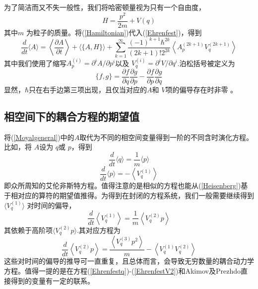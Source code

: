 为了简洁而又不失一般性，我们将哈密顿量视为只有一个自由度，
\begin{equation}
	H=\frac{p^{2}}{2 m}+V(q)
	\label{Hamiltonian}
\end{equation}
其中$m$ 为粒子的质量。将(\ref{Hamiltonian})代入(\ref{Ehrenfest})，得到
\begin{equation}
	\frac{d}{d t}\langle A\rangle=\left\langle\frac{\partial A}{\partial t}\right\rangle+\langle\{A, H\}\rangle+\sum_{k=1}^{\infty} \frac{(-1)^{k+1} \hbar^{2 k}}{(2 k+1) ! 2^{2 k}}\left\langle A_{p}^{(2 k+1)} V_{q}^{(2 k+1)}\right\rangle
	\label{Moyalgeneral}
\end{equation}
其中我们使用了缩写$A_{p}^{(i)}=\partial^{i} A / \partial p^{i}$以及 $V_{q}^{(i)}=\partial^{i} V / \partial q^{i}$.泊松括号被定义为
\begin{equation}
	\{f, g\}=\frac{\partial f}{\partial q} \frac{\partial g}{\partial p}-\frac{\partial f}{\partial p} \frac{\partial g}{\partial q}
\end{equation}
显然，$\hbar$只在右手边第三项出现，且仅当对应的$A$和 $V$项的偏导存在时非零 。

\subsection{相空间下的耦合方程的期望值}
将(\ref{Moyalgeneral})中的$A$取代为不同的相空间变量得到一阶的不同含时演化方程。比如，将 $A$设为 $q$或 $p$，得到
\begin{equation}
\frac{d}{d t}\langle q\rangle=\frac{1}{m}\langle p\rangle
\label{Ehrenfestq}
\end{equation}
\begin{equation}
\frac{d}{d t}\langle p\rangle=-\left\langle V_{q}^{(1)}\right\rangle	
\end{equation}
即众所周知的艾伦非斯特方程。值得注意的是相似的方程也能从(\ref{Heisenberg})基于相对应的算符的期望值推得。为得到在封闭的方程系统，我们一般需要继续得到$\langle V_q^{(1)} \rangle $ 对时间的偏导，
\begin{equation}
	\frac{d}{d t}\left\langle V_{q}^{(1)}\right\rangle=\frac{1}{m}\left\langle V_{q}^{(2)} p\right\rangle
\end{equation}
其依赖于高阶项$\langle V_q^{(2)} p \rangle $.其对应方程为
\begin{equation}
	\frac{d}{d t}\left\langle V_{q}^{(2)} p\right\rangle=\frac{\left\langle V_{q}^{(3)} p^{2}\right\rangle}{m}-\left\langle V_{q}^{(1)} V_{q}^{(2)}\right\rangle
\label{EhrenfestV2}
\end{equation}
这些对时间的偏导的推导可一直重复，且总体而言，会导致无穷数量的耦合动力学方程。值得一提的是在方程(\ref{Ehrenfestq})-(\ref{EhrenfestV2})和Akimov及Prezhdo直接得到的变量有一定的联系。


